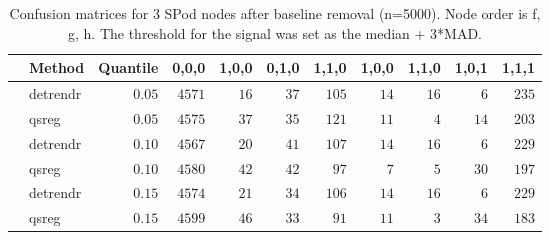 \begin{table}[!tbp]
\caption{Confusion matrices for 3 SPod nodes after baseline 
      removal (n=5000). Node order is f, g, h. The threshold for the signal was 
      set as the median + 3*MAD.\label{confusion}} 
\begin{center}
\begin{tabular}{llrrrrrrrrr}
\hline\hline
\multicolumn{1}{l}{}&\multicolumn{1}{c}{Method}&\multicolumn{1}{c}{Quantile}&\multicolumn{1}{c}{0,0,0}&\multicolumn{1}{c}{1,0,0}&\multicolumn{1}{c}{0,1,0}&\multicolumn{1}{c}{1,1,0}&\multicolumn{1}{c}{1,0,0}&\multicolumn{1}{c}{1,1,0}&\multicolumn{1}{c}{1,0,1}&\multicolumn{1}{c}{1,1,1}\tabularnewline
\hline
&detrendr&$0.05$&$4571$&$16$&$37$&$105$&$14$&$16$&$ 6$&$235$\tabularnewline
&qsreg&$0.05$&$4575$&$37$&$35$&$121$&$11$&$ 4$&$14$&$203$\tabularnewline
&detrendr&$0.10$&$4567$&$20$&$41$&$107$&$14$&$16$&$ 6$&$229$\tabularnewline
&qsreg&$0.10$&$4580$&$42$&$42$&$ 97$&$ 7$&$ 5$&$30$&$197$\tabularnewline
&detrendr&$0.15$&$4574$&$21$&$34$&$106$&$14$&$16$&$ 6$&$229$\tabularnewline
&qsreg&$0.15$&$4599$&$46$&$33$&$ 91$&$11$&$ 3$&$34$&$183$\tabularnewline
\hline
\end{tabular}\end{center}
\end{table}
